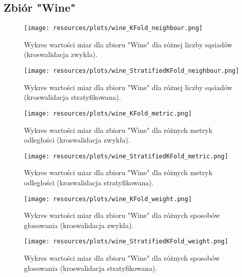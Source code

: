 \subsection{Zbiór "Wine"}
    \begin{figure}[H]
        \center
        \texttt{[image: resources/plots/wine\_KFold\_neighbour.png]}
        \caption{Wykres wartości miar dla zbioru "Wine" dla różnej liczby sąsiadów (kroswalidacja zwykła).}
    \end{figure}

    \begin{figure}[H]
        \center
        \texttt{[image: resources/plots/wine\_StratifiedKFold\_neighbour.png]}
        \caption{Wykres wartości miar dla zbioru "Wine" dla różnej liczby sąsiadów (kroswalidacja stratyfikowana).}
    \end{figure}

    \pagebreak

    \begin{figure}[H]
        \center
        \texttt{[image: resources/plots/wine\_KFold\_metric.png]}
        \caption{Wykres wartości miar dla zbioru "Wine" dla różnych metryk odległości (kroswalidacja zwykła).}
    \end{figure}

    \begin{figure}[H]
        \center
        \texttt{[image: resources/plots/wine\_StratifiedKFold\_metric.png]}
        \caption{Wykres wartości miar dla zbioru "Wine" dla różnych metryk odległości (kroswalidacja stratyfikowana).}
    \end{figure}

    \pagebreak

    \begin{figure}[H]
        \center
        \texttt{[image: resources/plots/wine\_KFold\_weight.png]}
        \caption{Wykres wartości miar dla zbioru "Wine" dla różnych sposobów głosowania (kroswalidacja zwykła).}
    \end{figure}

    \begin{figure}[H]
        \center
        \texttt{[image: resources/plots/wine\_StratifiedKFold\_weight.png]}
        \caption{Wykres wartości miar dla zbioru "Wine" dla różnych sposobów głosowania (kroswalidacja stratyfikowana).}
    \end{figure}
